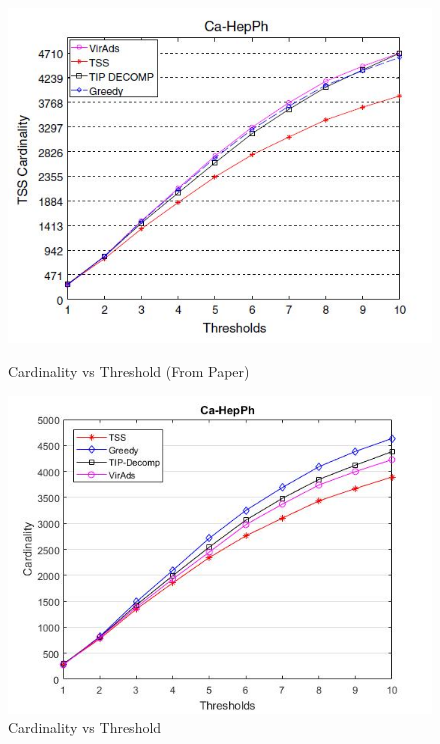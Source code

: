 \begin{figure}[h!]
\begin{minipage}[t]{0.50\textwidth}
\includegraphics[width=\linewidth,keepaspectratio=true]{images/ca-hepphpaper.jpg}
\caption{Cardinality vs Threshold (From Paper)}

\end{minipage}
\begin{minipage}[t]{0.50\textwidth}
\includegraphics[width=\linewidth,keepaspectratio=true]{images/ca-hepphresult.jpg}
\caption{Cardinality vs Threshold}
\end{minipage}
\end{figure}

